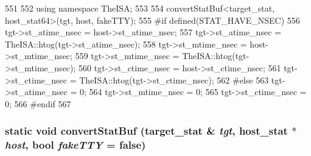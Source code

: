\begin{DoxyCode}
551 {
552     using namespace TheISA;
553 
554     convertStatBuf<target_stat, host_stat64>(tgt, host, fakeTTY);
555 #if defined(STAT_HAVE_NSEC)
556     tgt->st_atime_nsec = host->st_atime_nsec;
557     tgt->st_atime_nsec = TheISA::htog(tgt->st_atime_nsec);
558     tgt->st_mtime_nsec = host->st_mtime_nsec;
559     tgt->st_mtime_nsec = TheISA::htog(tgt->st_mtime_nsec);
560     tgt->st_ctime_nsec = host->st_ctime_nsec;
561     tgt->st_ctime_nsec = TheISA::htog(tgt->st_ctime_nsec);
562 #else
563     tgt->st_atime_nsec = 0;
564     tgt->st_mtime_nsec = 0;
565     tgt->st_ctime_nsec = 0;
566 #endif
567 }
\end{DoxyCode}
\hypertarget{syscall__emul_8hh_a89261d6022ca29a6b473edc80acb77ad}{
\subsubsection[{convertStatBuf}]{\setlength{\rightskip}{0pt plus 5cm}static void convertStatBuf (target\_\-stat \& {\em tgt}, \/  host\_\-stat $\ast$ {\em host}, \/  bool {\em fakeTTY} = {\ttfamily false})}}
\label{syscall__emul_8hh_a89261d6022ca29a6b473edc80acb77ad}



